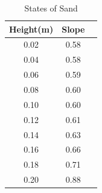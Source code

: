 \documentclass[12pt]{article}
\begin{document}
\begin{table}[H]
    \caption{States of Sand}
    \vspace{10pt}
    \centering
    \begin{tabular}{ccc}
        \hline
        Height(m) & Slope \\
        \hline
        0.02      & 0.58  \\
        0.04      & 0.58  \\
        0.06      & 0.59  \\
        0.08      & 0.60  \\
        0.10      & 0.60  \\
        0.12      & 0.61  \\
        0.14      & 0.63  \\
        0.16      & 0.66  \\
        0.18      & 0.71  \\
        0.20      & 0.88  \\
        \hline
    \end{tabular}
    \label{bs2}
\end{table}
\end{document}
